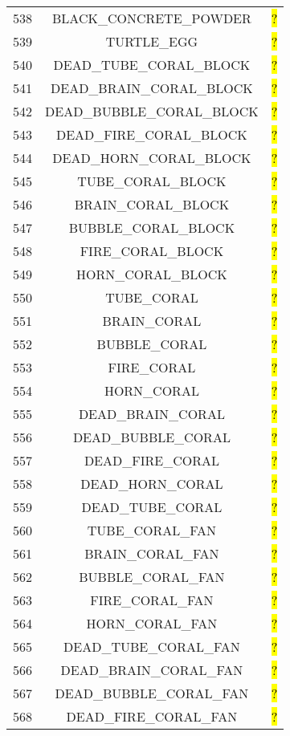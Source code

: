 \documentclass[11pt]{article}
\newcommand\myworries[1]{\sethlcolor{red}\hl{#1}}
\begin{document}
\begin{longtable}{ |c|c|c| }
	538 & BLACK\_CONCRETE\_POWDER & \myworries{?} \\
	539 & TURTLE\_EGG & \myworries{?} \\
	540 & DEAD\_TUBE\_CORAL\_BLOCK & \myworries{?} \\
	541 & DEAD\_BRAIN\_CORAL\_BLOCK & \myworries{?} \\
	542 & DEAD\_BUBBLE\_CORAL\_BLOCK & \myworries{?} \\
	543 & DEAD\_FIRE\_CORAL\_BLOCK & \myworries{?} \\
	544 & DEAD\_HORN\_CORAL\_BLOCK & \myworries{?} \\
	545 & TUBE\_CORAL\_BLOCK & \myworries{?} \\
	546 & BRAIN\_CORAL\_BLOCK & \myworries{?} \\
	547 & BUBBLE\_CORAL\_BLOCK & \myworries{?} \\
	548 & FIRE\_CORAL\_BLOCK & \myworries{?} \\
	549 & HORN\_CORAL\_BLOCK & \myworries{?} \\
	550 & TUBE\_CORAL & \myworries{?} \\
	551 & BRAIN\_CORAL & \myworries{?} \\
	552 & BUBBLE\_CORAL & \myworries{?} \\
	553 & FIRE\_CORAL & \myworries{?} \\
	554 & HORN\_CORAL & \myworries{?} \\
	555 & DEAD\_BRAIN\_CORAL & \myworries{?} \\
	556 & DEAD\_BUBBLE\_CORAL & \myworries{?} \\
	557 & DEAD\_FIRE\_CORAL & \myworries{?} \\
	558 & DEAD\_HORN\_CORAL & \myworries{?} \\
	559 & DEAD\_TUBE\_CORAL & \myworries{?} \\
	560 & TUBE\_CORAL\_FAN & \myworries{?} \\
	561 & BRAIN\_CORAL\_FAN & \myworries{?} \\
	562 & BUBBLE\_CORAL\_FAN & \myworries{?} \\
	563 & FIRE\_CORAL\_FAN & \myworries{?} \\
	564 & HORN\_CORAL\_FAN & \myworries{?} \\
	565 & DEAD\_TUBE\_CORAL\_FAN & \myworries{?} \\
	566 & DEAD\_BRAIN\_CORAL\_FAN & \myworries{?} \\
	567 & DEAD\_BUBBLE\_CORAL\_FAN & \myworries{?} \\
	568 & DEAD\_FIRE\_CORAL\_FAN & \myworries{?} \\

\end{longtable}
\end{document}
